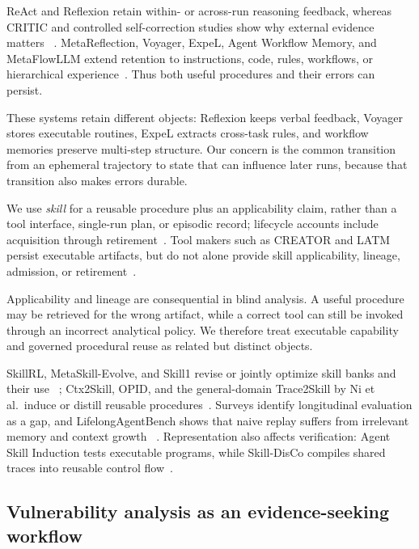\documentclass[11pt]{article}
\begin{document}
ReAct and Reflexion retain within- or across-run reasoning feedback, whereas CRITIC and
controlled self-correction studies show why external evidence matters
~\cite{react,reflexion,critic,noselfcorrect}.  MetaReflection, Voyager, ExpeL, Agent
Workflow Memory, and MetaFlowLLM extend retention to instructions, code, rules, workflows,
or hierarchical experience~\cite{metareflection,voyager,expel,awm,metaflowllm}.  Thus both
useful procedures and their errors can persist.

These systems retain different objects: Reflexion keeps verbal feedback, Voyager stores
executable routines, ExpeL extracts cross-task rules, and workflow memories preserve
multi-step structure.  Our concern is the common transition from an ephemeral trajectory
to state that can influence later runs, because that transition also makes errors durable.

We use \emph{skill} for a reusable procedure plus an applicability claim, rather than a
tool interface, single-run plan, or episodic record; lifecycle accounts include
acquisition through retirement~\cite{agenticskillssok}.  Tool makers such as CREATOR and
LATM persist executable artifacts, but do not alone provide skill applicability, lineage,
admission, or retirement~\cite{creator,latm,llmtoolusesurveyzh}.

Applicability and lineage are consequential in blind analysis.  A useful procedure may be
retrieved for the wrong artifact, while a correct tool can still be invoked through an
incorrect analytical policy.  We therefore treat executable capability and governed
procedural reuse as related but distinct objects.

SkillRL, MetaSkill-Evolve, and Skill1 revise or jointly optimize skill banks and their use
~\cite{skillrl,metaskillevolve,skillone}; Ctx2Skill, OPID, and the general-domain
Trace2Skill by Ni et al.\ induce or distill reusable procedures~\cite{ctx2skill,opid,trace2skill}.
Surveys identify longitudinal evaluation as a gap, and LifelongAgentBench shows that
naive replay suffers from irrelevant memory and context growth
~\cite{dynamicskills,skillsurveyeval,lifelongagentbench}.  Representation also affects
verification: Agent Skill Induction tests executable programs, while Skill-DisCo compiles
shared traces into reusable control flow~\cite{asi,skilldisco}.

\subsection{Vulnerability analysis as an evidence-seeking workflow}
\end{document}
